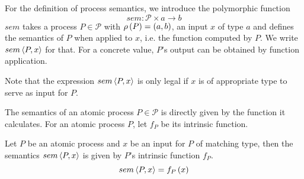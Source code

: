 

For the definition of process semantics, we introduce the polymorphic function 
\begin{equation*}
  sem \colon \mathcal{P} \times a \to b
\end{equation*}
$sem$ takes a process $P \in \mathcal{P}$ with $\rho \left( P \right) = \left( a, b \right)$, an input $x$ of type $a$ and defines the semantics of $P$ when applied to $x$, i.e. the function computed by $P$. We write $sem \left\langle P, x \right\rangle$ for that. For a concrete value, $P$'s output can be obtained by function application.

Note that the expression $sem \left\langle P, x \right\rangle$ is only legal if $x$ is of appropriate type to serve as input for $P$.



The semantics of an atomic process $P \in \mathcal{P}$ is directly given by the function it calculates. For an atomic process $P$, let $f_P$ be its intrinsic function. 
\begin{definition}
  \label{def:sem_atomic}
  Let $P$ be an atomic process and $x$ be an input for $P$ of matching type, then the semantics $sem \left\langle P, x \right\rangle$ is given by $P$'s intrinsic function $f_P$.
  \begin{equation}
    \label{eqn:sem_atomic}
    sem \left\langle P, x \right\rangle = f_P \left( x \right)
  \end{equation}
  \hfill\qedsymbol
\end{definition}

